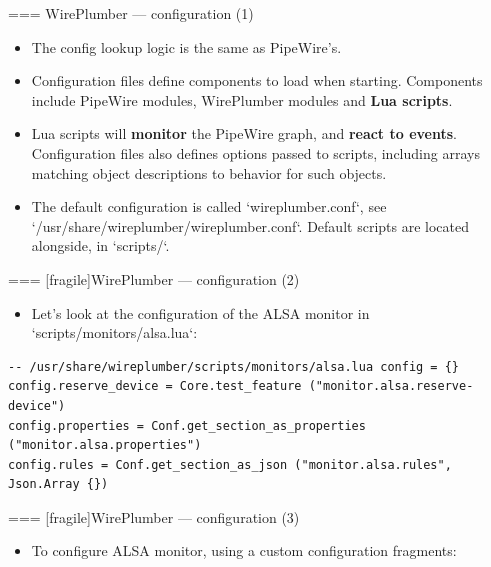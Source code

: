 === {WirePlumber — configuration (1)}
  \begin{itemize}


  \item The config lookup logic is the same as PipeWire's.

  \item Configuration files define components to load when starting. Components
    include PipeWire modules, WirePlumber modules and \textbf{Lua scripts}.

  \item Lua scripts will \textbf{monitor} the PipeWire graph, and
    \textbf{react to events}. Configuration files also defines options passed
    to scripts, including arrays matching object descriptions to behavior for
    such objects.

  \item The default configuration is called `wireplumber.conf`, see
    `/usr/share/wireplumber/wireplumber.conf`. Default scripts are located
    alongside, in `scripts/`.

  \end{itemize}




=== [fragile]{WirePlumber — configuration (2)}
  \begin{itemize}
  \item Let's look at the configuration of the ALSA monitor
    in `scripts/monitors/alsa.lua`:
  \end{itemize}

    \begin{block}{}
      \fontsize{10}{10}\selectfont
        \begin{verbatim}
-- /usr/share/wireplumber/scripts/monitors/alsa.lua config = {}
config.reserve_device = Core.test_feature ("monitor.alsa.reserve-device")
config.properties = Conf.get_section_as_properties ("monitor.alsa.properties")
config.rules = Conf.get_section_as_json ("monitor.alsa.rules", Json.Array {})
          \end{verbatim}
        \end{block}




=== [fragile]{WirePlumber — configuration (3)}
  \begin{itemize}
  \item To configure ALSA monitor, using a custom configuration fragments:
  \end{itemize}

